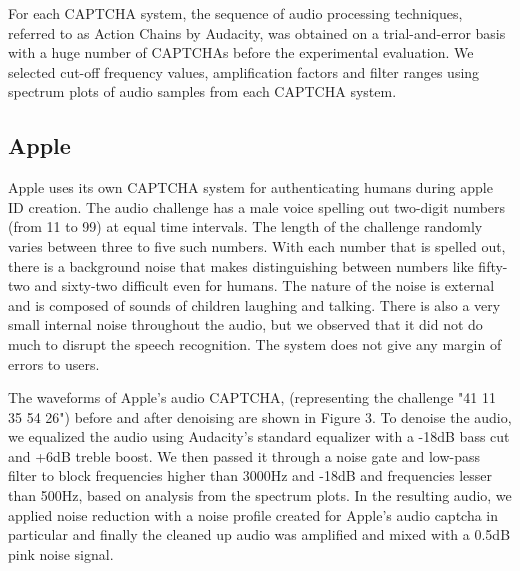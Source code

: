 For each CAPTCHA system, the sequence of audio processing techniques, referred to as Action Chains by Audacity, was obtained on a trial-and-error basis with a huge number of CAPTCHAs before the experimental evaluation. We selected cut-off frequency values, amplification factors and filter ranges using spectrum plots of audio samples from each CAPTCHA system.\newline

\subsection{Apple}
\label{sec:apple}

Apple uses its own CAPTCHA system for authenticating humans during apple ID creation. The audio challenge has a male voice spelling out two-digit numbers (from 11 to 99) at equal time intervals. The length of the challenge randomly varies between three to five such numbers. With each number that is spelled out, there is a background noise that makes distinguishing between numbers like fifty-two and sixty-two difficult even for humans. The nature of the noise is external and is composed of sounds of children laughing and talking. There is also a very small internal noise throughout the audio, but we observed that it did not do much to disrupt the speech recognition. The system does not give any margin of errors to users.\newline

The waveforms of Apple's audio CAPTCHA, (representing the challenge "41 11 35 54 26") before and after denoising are shown in Figure 3. To denoise the audio, we equalized the audio using Audacity's standard equalizer with a -18dB bass cut and  +6dB treble boost. We then passed it through a noise gate and low-pass filter to block frequencies higher than 3000Hz and -18dB and frequencies lesser than 500Hz, based on analysis from the spectrum plots. In the resulting audio, we applied noise reduction with a noise profile created for Apple's audio captcha in particular and finally the cleaned up audio was amplified and mixed with a 0.5dB pink noise signal. \newline

